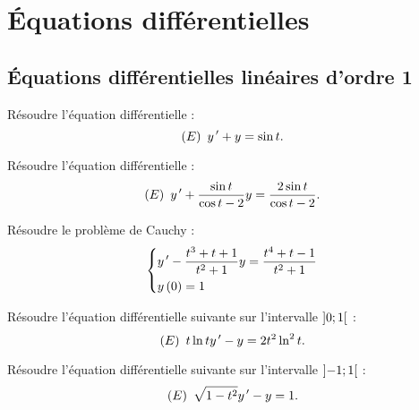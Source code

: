 \chapter{Équations différentielles}

\section{Équations différentielles linéaires d'ordre 1}

\begin{exo}[Exercice 1]
Résoudre l'équation différentielle : \[\left(E\right)~y^{\,\prime}+y=\sin t.\]
\end{exo}

\begin{corr}
\end{corr}

\begin{exo}[Exercice 2]
Résoudre l'équation différentielle : \[\left(E\right)~y^{\,\prime}+\dfrac{\sin t}{\cos t-2}y=\dfrac{2\sin t}{\cos t-2}.\]
\end{exo}

\begin{corr}
\end{corr}

\begin{exo}[Exercice 3]
Résoudre le problème de Cauchy : \[\begin{dcases}
y^{\,\prime}-\dfrac{t^3+t+1}{t^2+1}y=\dfrac{t^4+t-1}{t^2+1} \\
y\left(0\right)=1
\end{dcases}\]
\end{exo}

\begin{corr}
\end{corr}

\begin{exo}[Exercice 4]
Résoudre l'équation différentielle suivante sur l'intervalle \(\left]0;1\right[\) : \[\left(E\right)~t\ln ty^{\,\prime}-y=2t^2\ln^2t.\]
\end{exo}

\begin{corr}
\end{corr}

\begin{exo}[Exercice 5]
Résoudre l'équation différentielle suivante sur l'intervalle \(\left]-1;1\right[\) : \[\left(E\right)~\sqrt{1-t^2}y^{\,\prime}-y=1.\]
\end{exo}

\begin{corr}
\end{corr}

